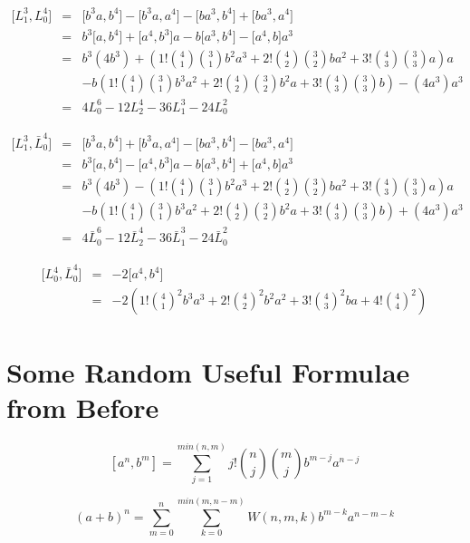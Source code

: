 \documentclass{article}
\newcommand{\lrbrack}[2]{\lbrack #1 , #2 \rbrack}
\begin{document}
\begin{eqnarray*}
\lrbrack{L_1^3}{L_0^4} & = & \lrbrack{b^3a }{b^4} - \lrbrack{b^3 a}{a^4} - \lrbrack{b a^3}{b^4} + \lrbrack{b a^3}{a^4}\\
                       & = & b^3 \lrbrack{a}{b^4} + \lrbrack{a^4}{b^3}a - b \lrbrack{a^3}{b^4} - \lrbrack{a^4}{b} a^3\\
                       & = & b^3(4b^3) + (1!{4\choose 1}{3\choose 1}b^2 a^3 + 2!{4\choose 2}{3\choose 2}b a^2 +  3!{4\choose 3}{3\choose 3}a)a\\
                       &   & - b(1!{4\choose 1}{3\choose 1}b^3 a^2 + 2!{4\choose 2}{3\choose 2}b^2 a +  3!{4\choose 3}{3\choose 3}b) - (4a^3)a^3\\
                       & = & 4 L_0^6 -  12 L_2^4 - 36 L_1^3 - 24 L_0^2
\end{eqnarray*}


\begin{eqnarray*}
	\lrbrack{L_1^3}{\bar{L}_0^4} & = & \lrbrack{b^3a }{b^4} + \lrbrack{b^3 a}{a^4} - \lrbrack{b a^3}{b^4} - \lrbrack{b a^3}{a^4}\\
	& = & b^3 \lrbrack{a}{b^4} - \lrbrack{a^4}{b^3}a - b \lrbrack{a^3}{b^4} + \lrbrack{a^4}{b} a^3\\
	& = & b^3(4b^3) - (1!{4\choose 1}{3\choose 1}b^2 a^3 + 2!{4\choose 2}{3\choose 2}b a^2 +  3!{4\choose 3}{3\choose 3}a)a\\
	&   & - b(1!{4\choose 1}{3\choose 1}b^3 a^2 + 2!{4\choose 2}{3\choose 2}b^2 a +  3!{4\choose 3}{3\choose 3}b) + (4a^3)a^3\\
	& = & 4 \bar{L}_0^6 -  12 \bar{L}_2^4 - 36 \bar{L}_1^3 - 24 \bar{L}_0^2
\end{eqnarray*}


\begin{eqnarray*}
\lrbrack{L_0^4}{\bar{L}_0^4} & = & -2 \lrbrack{a^4}{b^4}\\
                             & = & -2 (1!{4\choose 1}^2 b^3 a^3 + 2!{4\choose 2}^2 b^2 a^2 + 3!{4\choose 3}^2 ba + 4!{4\choose 4}^2 )
\end{eqnarray*}



\section*{Some Random Useful Formulae from Before}


\[
[a^n, b^m] = \sum_{j=1}^{min(n,m)}j! {n\choose j}{m \choose j}b^{m-j}a^{n-j}
\]

\[
(a+b)^n = \sum_{m=0}^{n} \sum_{k=0}^{min(m,n-m)} W(n,m,k)b^{m-k} a^{n-m-k}
\]
\end{document}
